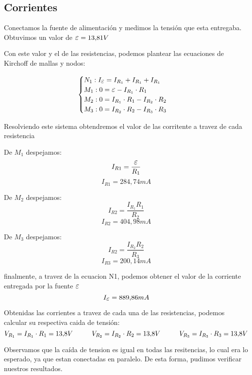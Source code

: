 \documentclass[12pt]{report}
\newcommand {\LEpsilon}{\mathlarger{\mathlarger{\varepsilon}}}
\begin{document}
\subsection{Corrientes}
Conectamos la fuente de alimentación y medimos la tensión que esta entregaba. Obtuvimos un valor de 
$ \LEpsilon=13,\!81 V $

Con este valor y el de las resistencias, podemos plantear las ecuaciones de Kirchoff de mallas y
nodos:

\[
\begin{cases}
  N_1 : I_{\LEpsilon} = I_{R_1} + I_{R_1} + I_{R_1} \\
  M_1 : 0 = \LEpsilon - I_{R_1} \cdot R_1 \\
  M_2 : 0 = I_{R_1} \cdot R_1 - I_{R_2} \cdot R_2 \\
  M_3 : 0 = I_{R_2} \cdot R_2 - I_{R_3} \cdot R_3
\end{cases}
\]

Resolviendo este sistema obtendremos el valor de las corritente a travez de cada resistencia

\noindent
\begin{minipage}[t]{0.33\textwidth}
  \centering
  De $M_1$ despejamos:
  $$I_{R1} = \frac{\LEpsilon}{R_1}$$
  $$I_{R1} = 284,\!74 mA $$
\end{minipage}
\begin{minipage}[t]{0.33\textwidth}
  \centering
  De $M_2$ despejamos:
  $$I_{R2} = \frac{I_{R_1}R_1}{R_2} $$
  $$I_{R2} = 404,\!98 mA $$
\end{minipage}
\begin{minipage}[t]{0.33\textwidth}
  \centering
  De $M_3$ despejamos:
  $$I_{R2} = \frac{I_{R_2}R_2}{R_3} $$
  $$I_{R3} = 200,\!14 mA $$
\end{minipage}

\vspace{7mm}

finalmente, a travez de la ecuacion N1, podemos obtener el valor de la corriente entregada 
por la fuente $\LEpsilon$
$$I_{\LEpsilon} = 889,\!86 mA$$

Obtenidas las corrientes a travez de cada una de las resistencias, podemos calcular su respectiva
caida de tensión:
$$ V_{R_1} = I_{R_1} \cdot R_1 = 13,\!8V \hspace{10mm} V_{R_2} = I_{R_2} \cdot R_2 = 13,\!8V 
\hspace{10mm} V_{R_3} = I_{R_3} \cdot R_3 = 13,\!8V $$

Observamos que la caída de tension es igual en todas las resitencias, lo cual era lo esperado, ya
que estan conectadas en paralelo. De esta forma, pudimos verificar nuestros resultados.
\end{document}
